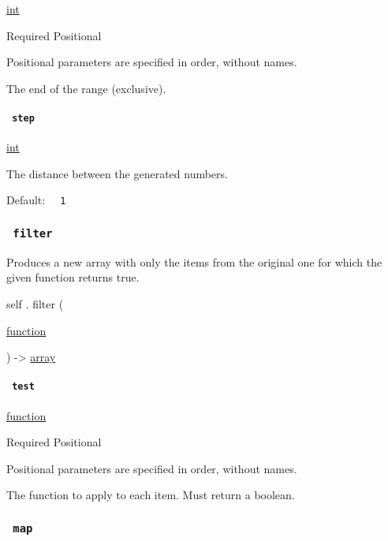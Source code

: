 \href{/docs/reference/foundations/int/}{int}

{Required} {{ Positional }}

\label{definitions-range-end-positional-tooltip}
Positional parameters are specified in order, without names.

The end of the range (exclusive).

\paragraph{\texorpdfstring{\texttt{\ step\ }}{ step }}\label{definitions-range-step}

\href{/docs/reference/foundations/int/}{int}

The distance between the generated numbers.

Default: \texttt{\ }{\texttt{\ 1\ }}\texttt{\ }

\subsubsection{\texorpdfstring{\texttt{\ filter\ }}{ filter }}\label{definitions-filter}

Produces a new array with only the items from the original one for which
the given function returns true.

self { . } { filter } (

{ \href{/docs/reference/foundations/function/}{function} }

) -\textgreater{} \href{/docs/reference/foundations/array/}{array}

\paragraph{\texorpdfstring{\texttt{\ test\ }}{ test }}\label{definitions-filter-test}

\href{/docs/reference/foundations/function/}{function}

{Required} {{ Positional }}

\label{definitions-filter-test-positional-tooltip}
Positional parameters are specified in order, without names.

The function to apply to each item. Must return a boolean.

\subsubsection{\texorpdfstring{\texttt{\ map\ }}{ map }}\label{definitions-map}

